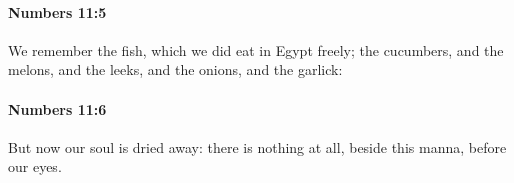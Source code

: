 		\paragraph{Numbers 11:5} %
			\label{NUMBERS-11-5}

			We remember the fish, which we did eat in Egypt freely; the cucumbers, and the melons, and the leeks, and the onions, and the garlick:


		\paragraph{Numbers 11:6} %
			\label{NUMBERS-11-6}

			But now our soul is dried away: there is nothing at all, beside this manna, before our eyes.


